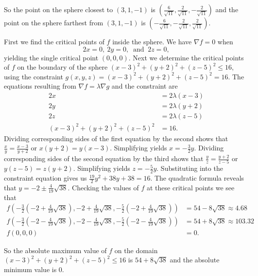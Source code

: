 \begin{exercises}
\begin{exerciseSolution}
So the point on the sphere closest to $(3,1,-1)$ is $\left(\frac{6}{\sqrt{11}}, \frac{2}{\sqrt{11}}, -\frac{2}{\sqrt{11}} \right)$ and the point on the sphere farthest from $(3,1,-1)$ is $\left(-\frac{6}{\sqrt{11}}, -\frac{2}{\sqrt{11}}, \frac{2}{\sqrt{11}} \right)$. 

		\item First we find the critical points of $f$ inside the sphere. We have $\nabla f = 0$ when 
\[2x = 0, \ 2y = 0, \ \text{ and } \ 2z = 0,\]
yielding the single critical point $(0,0,0)$. Next we determine the critical points of $f$ on the boundary of the sphere $(x-3)^2 + (y+2)^2 + (z-5)^2 \le 16$, using the constraint $g(x,y,z) = (x-3)^2 + (y+2)^2 + (z-5)^2 = 16$. The equations resulting from $\nabla f = \lambda \nabla g$ and the constraint are  
\begin{align*}
2x &= 2\lambda (x-3) \\
2y &= 2\lambda (y+2) \\
2z &= 2\lambda (z-5) \\
(x-3)^2 + (y+2)^2 + (z-5)^2 &= 16.
\end{align*}
Dividing corresponding sides of the first equation by the second shows that $\frac{x}{y} = \frac{x-3}{y+2}$ or $x(y+2)=y(x-3)$. Simplifying yields $x=-\frac{3}{2}y$. Dividing corresponding sides of the second equation by the third shows that $\frac{y}{z}=\frac{y+2}{z-5}$ or $y(z-5) = z(y+2)$. Simplifying yields $z=-\frac{5}{2}y$. Substituting into the constraint equation gives us $\frac{19}{2}y^2+38y+38=16$. The quadratic formula reveals that $y = -2 \pm \frac{4}{19} \sqrt{38}$. Checking the values of $f$ at these critical points we see that 
\begin{align*}
f\left(-\frac{3}{2}\left(-2 +\frac{4}{19} \sqrt{38}\right), -2 + \frac{4}{19} \sqrt{38}, -\frac{5}{2}\left(-2 +\frac{4}{19} \sqrt{38}\right) \right) &= 54-8\sqrt{38} \approx 4.68 \\
f\left(-\frac{3}{2}\left(-2 -\frac{4}{19} \sqrt{38}\right), -2 - \frac{4}{19} \sqrt{38}, -\frac{5}{2}\left(-2 -\frac{4}{19} \sqrt{38}\right)  \right) &= 54+8\sqrt{38} \approx 103.32 \\
f(0,0,0) &= 0.
\end{align*}

So the absolute maximum value of $f$ on the domain $(x-3)^2 + (y+2)^2 + (z-5)^2 \le 16$ is $54+8\sqrt{38}$ and the absolute minimum value is 0.  

	\ea	
\end{exerciseSolution}


\end{exercises}
